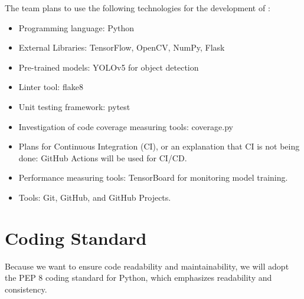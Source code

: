 \documentclass{article}
\begin{document}
The team plans to use the following technologies for the development of \progname{}:
\begin{itemize}
\item Programming language: Python
\item External Libraries: TensorFlow, OpenCV, NumPy, Flask
\item Pre-trained models: YOLOv5 for object detection
\item Linter tool: flake8
\item Unit testing framework: pytest
\item Investigation of code coverage measuring tools: coverage.py
\item Plans for Continuous Integration (CI), or an explanation that CI
  is not being done: GitHub Actions will be used for CI/CD.
\item Performance measuring tools: TensorBoard for monitoring model training.
\item Tools: Git, GitHub, and GitHub Projects.
\end{itemize}


\section{Coding Standard}

Because we want to ensure code readability and maintainability,
we will adopt the PEP 8 coding standard for Python, which emphasizes readability and consistency.
\end{document}
